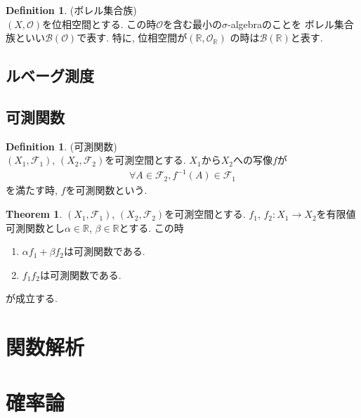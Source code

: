 \documentclass[11pt, a4paper, dvipdfmx]{jsbook}
\theoremstyle{definition}
\newtheorem{Definition+}[Axiom+]{Definition}
\newtheorem{Theorem+}[Axiom+]{Theorem}
\newcommand{\R}{\mathbb{R}}
\newcommand{\F}{\mathcal{F}}
\begin{document}
\begin{Definition+}(ボレル集合族)\\
  $(X, \mathscr{O})$を位相空間とする. この時$\mathscr{O}$を含む最小の$\sigma$-algebraのことを
  ボレル集合族といい$\mathcal{B}(\mathscr{O})$で表す. 特に, 位相空間が$(\R, \mathscr{O}_{\R})$
  の時は$\mathcal{B}(\R)$と表す.
\end{Definition+}
\section{ルベーグ測度}
\section{可測関数}
\begin{Definition+}(可測関数)\\
  $(X_{1}, \F_{1})$, $(X_{2}, \F_{2})$を可測空間とする. $X_{1}$から$X_{2}$への写像$f$が
  \begin{align*}
    \forall A\in\F_{2}, f^{-1}(A)\in\F_{1}
  \end{align*}
  を満たす時, $f$を可測関数という.
\end{Definition+}

\begin{Theorem+}
  $(X_{1}, \F_{1})$, $(X_{2}, \F_{2})$を可測空間とする. $f_{1}$, $f_{2}:X_{1}\to X_{2}$を有限値可測関数とし$\alpha\in\R$, $\beta\in\R$とする. この時
  \begin{enumerate}
    \item $\alpha f_{1} + \beta  f_{2}$は可測関数である.
    \item $f_{1}f_{2}$は可測関数である.
  \end{enumerate}
  が成立する.
\end{Theorem+}
\chapter{関数解析}
\chapter{確率論}
\end{document}
